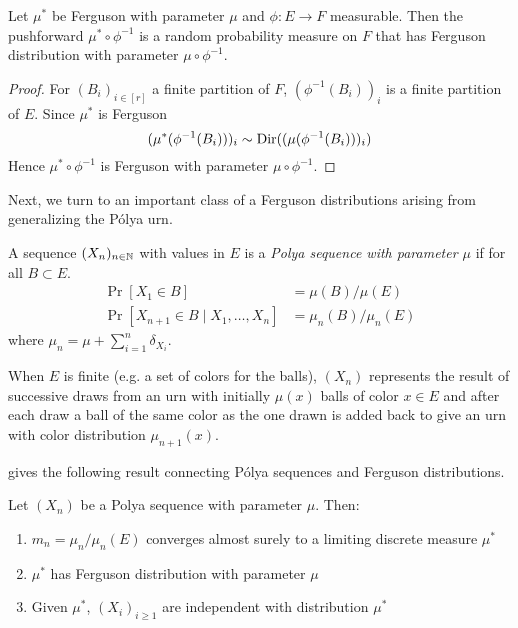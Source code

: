 \begin{lemma}
  Let $\mu^*$ be Ferguson with parameter $\mu$
  and $\phi : E \to F$ measurable.
  Then the pushforward $\mu^* \circ \phi^{-1}$ is a random
  probability measure on $F$ that has Ferguson distribution
  with parameter $\mu \circ \phi^{-1}$.
\end{lemma}

\begin{proof}
  For $(B_i)_{i \in [r]}$ a finite partition of $F$,
  $(\phi^{-1}(B_i))_i$ is a finite partition of $E$.
  Since $\mu^*$ is Ferguson
  \[
    (\mu^*(\phi^{-1}(B_i)))_i
    \sim \mathrm{Dir}( (\mu(\phi^{-1}(B_i)))_i)
  \]
  Hence $\mu^* \circ \phi^{-1}$ is Ferguson with parameter
  $\mu \circ \phi^{-1}$.
\end{proof}

Next, we turn to an important class of a Ferguson distributions
arising from generalizing the P\'olya urn.

\begin{definition}
  A sequence $(X_n)_{n \in \mathbb{N}}$ with values in $E$ is
  a \emph{Polya sequence with parameter $\mu$} if
  for all $B \subset E$.
  \begin{align*}
    \Pr[X_1 \in B] &= \mu(B) / \mu(E) \\
    \Pr[X_{n+1} \in B \mid X_1, \ldots, X_n] &= \mu_n(B) / \mu_n(E)
  \end{align*}
  where $\mu_n = \mu + \sum_{i=1}^n \delta_{X_i}$.
\end{definition}

\begin{remark}
  When $E$ is finite (e.g. a set of colors for the balls), $(X_n)$ represents
  the result of successive draws from an urn with initially $\mu(x)$ balls of
  color $x \in E$ and after each draw a ball of the same color as the one drawn
  is added back to give an urn with color distribution $\mu_{n+1}(x)$.
\end{remark}

\cite{blackwell1973} gives the following result connecting P\'olya sequences
and Ferguson distributions.

\begin{theorem}
  Let $(X_n)$ be a Polya sequence with parameter $\mu$. Then:
  \begin{enumerate}
    \item $m_n = \mu_n / \mu_n(E)$ converges almost surely to
      a limiting discrete measure $\mu^*$
    \item $\mu^*$ has Ferguson distribution with parameter $\mu$
    \item Given $\mu^*$, $(X_i)_{i \geq 1}$ are independent with
      distribution $\mu^*$
  \end{enumerate}
\end{theorem}

